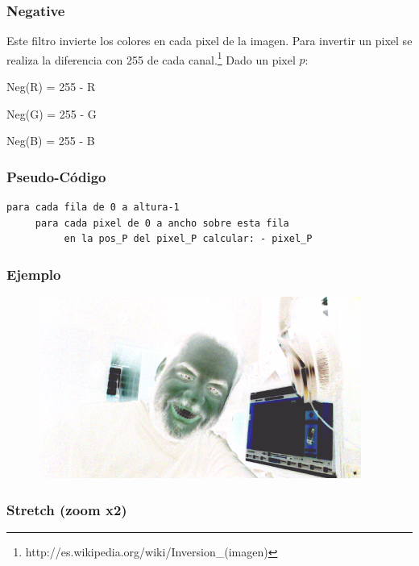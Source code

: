 \subsubsection{Negative}

Este filtro invierte los colores en cada pixel de la imagen. Para invertir un pixel se realiza la diferencia con 255 de cada canal.\footnote{http://es.wikipedia.org/wiki/Inversion\_(imagen)}
Dado un pixel $p$:\\

\begin{center}

Neg(R) = 255 - R

Neg(G) = 255 - G

Neg(B) = 255 - B
 
\end{center}
\subsubsection*{Pseudo-C\'odigo}
\begin{verbatim}
para cada fila de 0 a altura-1
     para cada pixel de 0 a ancho sobre esta fila
          en la pos_P del pixel_P calcular: - pixel_P
\end{verbatim}
\subsubsection*{Ejemplo}
\begin{center}
  \begin{figure}[H]
  \includegraphics[scale=0.60]{imgs/neg.png}
  \end{figure}  
\end{center}

\subsubsection{Stretch (zoom x2)}

